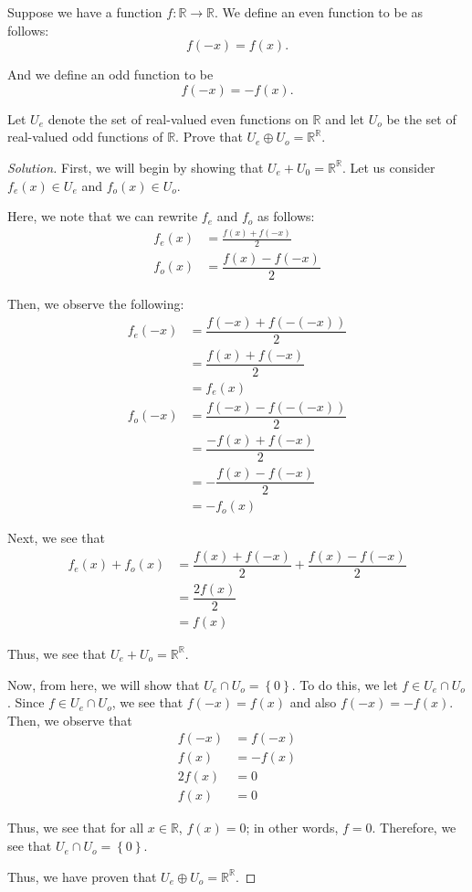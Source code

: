 \documentclass[openany]{book}
\newenvironment{solution}{\begin{proof}[Solution]}{\end{proof}}
\newcommand{\RR}{\mathbb{R}}
\begin{document}
\begin{hw}
	Suppose we have a function $f : \RR \rightarrow \RR$. We define an even function to be as follows:
	\begin{equation*}
		f(-x) = f(x).
	\end{equation*}

	And we define an odd function to be
	\begin{equation*}
		f(-x) = -f(x).
	\end{equation*}

	Let $U_{e}$ denote the set of real-valued even functions on $\RR$ and let $U_{o}$ be the set of real-valued odd functions of $\RR$. Prove that $U_{e} \oplus U_{o} = \RR^{\RR}$.
\end{hw}
\begin{solution}
	First, we will begin by showing that $U_{e} + U_{0} = \RR^{\RR}$. Let us consider $f_{e}(x) \in U_{e}$ and $f_{o}(x) \in U_{o}$.
	
	Here, we note that we can rewrite $f_{e}$ and $f_{o}$ as follows:
	\begin{align*}
		f_{e}(x) &= \frac{f(x) + f(-x)}{2} \\
		f_{o}(x) &= \dfrac{f(x) - f(-x)}{2}
	\end{align*} 

	Then, we observe the following:
	\begin{align*}
		f_{e}(-x) &= \dfrac{f(-x) + f(-(-x))}{2} \\
		&= \dfrac{f(x) + f(-x)}{2} \\
		&= f_{e}(x) \\
		f_{o}(-x) &= \dfrac{f(-x) - f(-(-x))}{2} \\
		&= \dfrac{-f(x) + f(-x)}{2} \\
		&= -\dfrac{f(x) - f(-x)}{2} \\
		&= -f_{o}(x)
	\end{align*}

	Next, we see that
	\begin{align*}
		f_{e}(x) + f_{o} (x) &= \dfrac{f(x) + f(-x)}{2} + \dfrac{f(x) - f(-x)}{2} \\
		&= \dfrac{2f(x)}{2} \\
		&= f(x)
	\end{align*}	

	Thus, we see that $U_{e} + U_{o} = \RR^{\RR}$.
	
	Now, from here, we will show that $U_{e} \cap U_{o} = \left\{  0\right\}$. To do this, we let $f \in U_{e} \cap U_{o}$. Since $f \in U_{e} \cap U_{o}$, we see that $f(-x) = f(x)$ and also $f(-x) = -f(x)$. Then, we observe that
	\begin{align*}
		f(-x) &= f(-x) \\
		f(x) &= -f(x) \\
		2f(x) &= 0 \\
		f(x) &= 0
	\end{align*}

	Thus, we see that for all $x \in \RR$, $f(x) = 0$; in other words, $f = 0$. Therefore, we see that $U_{e} \cap U_{o} = \left\{  0\right\}$.
	
	Thus, we have proven that $U_{e} \oplus U_{o} = \RR^{\RR}$.
\end{solution}
\end{document}
